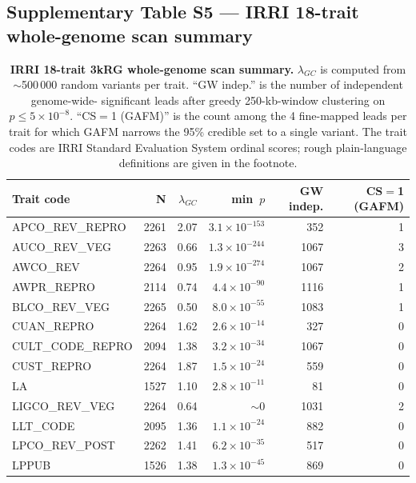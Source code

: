 \clearpage

\subsection*{Supplementary Table S5 --- IRRI 18-trait whole-genome scan summary}

\begin{table}[htbp]
\centering
\small
\caption{\textbf{IRRI 18-trait 3kRG whole-genome scan summary.}
$\lambda_{GC}$ is computed from $\sim$500\,000 random variants per
trait. ``GW indep.'' is the number of independent genome-wide-
significant leads after greedy 250-kb-window clustering on $p\leq
5\times10^{-8}$. ``CS$=$1 (GAFM)'' is the count among the 4
fine-mapped leads per trait for which GAFM narrows the 95\% credible
set to a single variant. The trait codes are IRRI Standard
Evaluation System ordinal scores; rough plain-language definitions
are given in the footnote.}
\label{tab:sup_irri_scan}
\begin{tabular}{lrrrrr}
\toprule
\textbf{Trait code} & \textbf{N} & $\lambda_{GC}$ & \textbf{min}~$p$ & \textbf{GW indep.} & \textbf{CS$=$1 (GAFM)} \\
\midrule
APCO\_REV\_REPRO  & 2261 & 2.07 & $3.1\times10^{-153}$ & 352  & 1 \\
AUCO\_REV\_VEG    & 2263 & 0.66 & $1.3\times10^{-244}$ & 1067 & 3 \\
AWCO\_REV         & 2264 & 0.95 & $1.9\times10^{-274}$ & 1067 & 2 \\
AWPR\_REPRO       & 2114 & 0.74 & $4.4\times10^{-90}$  & 1116 & 1 \\
BLCO\_REV\_VEG    & 2265 & 0.50 & $8.0\times10^{-55}$  & 1083 & 1 \\
CUAN\_REPRO       & 2264 & 1.62 & $2.6\times10^{-14}$  & 327  & 0 \\
CULT\_CODE\_REPRO & 2094 & 1.38 & $3.2\times10^{-34}$  & 1067 & 0 \\
CUST\_REPRO       & 2264 & 1.87 & $1.5\times10^{-24}$  & 559  & 0 \\
LA                & 1527 & 1.10 & $2.8\times10^{-11}$  & 81   & 0 \\
LIGCO\_REV\_VEG   & 2264 & 0.64 & $\sim$0              & 1031 & 2 \\
LLT\_CODE         & 2095 & 1.36 & $1.1\times10^{-24}$  & 882  & 0 \\
LPCO\_REV\_POST   & 2262 & 1.41 & $6.2\times10^{-35}$  & 517  & 0 \\
LPPUB             & 1526 & 1.38 & $1.3\times10^{-45}$  & 869  & 0 \\

\end{tabular}
\end{table}

